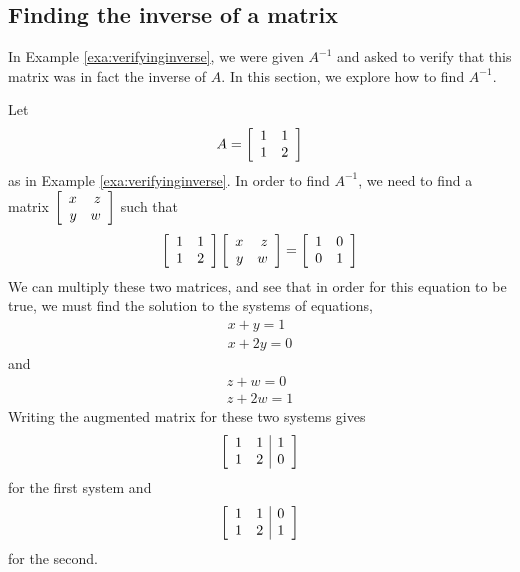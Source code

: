 
\subsection{Finding the inverse of a matrix}

In Example \ref{exa:verifyinginverse}, we were given $A^{-1}$ and asked to verify that this matrix
was in fact the inverse of $A$. In this section, we explore how to find $A^{-1}$. 

Let 
\begin{equation*}
A=\left[
\begin{array}{rr}
1 & 1 \\
1 & 2
\end{array}
\right]
\end{equation*}
as in Example \ref{exa:verifyinginverse}. 
In order to find $A^{-1}$, we need to find
a matrix $\left[
\begin{array}{rr}
x & z \\
y & w
\end{array}
\right] $ such that
\begin{equation*}
\left[
\begin{array}{rr}
1 & 1 \\
1 & 2
\end{array}
\right] \left[
\begin{array}{rr}
x & z \\
y & w
\end{array}
\right] =\left[
\begin{array}{rr}
1 & 0 \\
0 & 1
\end{array}
\right] 
\end{equation*}
We can multiply these two matrices, and see that in order for this equation to be true, we must find the solution to the systems of equations,
\begin{equation*}
\begin{array}{c}
x+y=1 \\
x+2y=0
\end{array}
\end{equation*}
and
\begin{equation*}
\begin{array}{c}
z+w=0 \\
z+2w=1
\end{array}
\end{equation*}
Writing the augmented matrix for these two systems gives
\begin{equation*}
\left[
\begin{array}{rr|r}
1 & 1 & 1 \\
1 & 2 & 0
\end{array}
\right]  
\end{equation*}
for the first system and
\begin{equation}
\left[
\begin{array}{rr|r}
1 & 1 & 0 \\
1 & 2 & 1
\end{array}
\right]  \label{inverse2a}
\end{equation}
for the second. 

